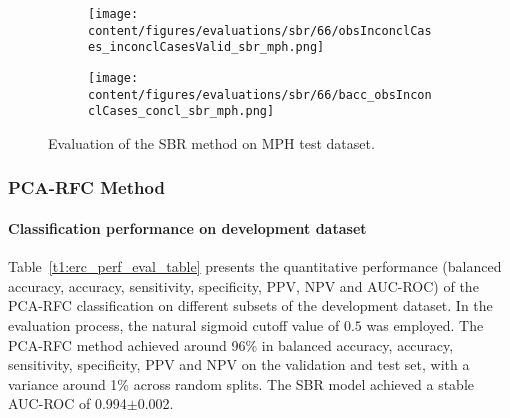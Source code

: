 \begin{figure}[ht]
  \begin{subfigure}{0.49\textwidth}
    \centering
    \texttt{[image: content/figures/evaluations/sbr/66/obsInconclCases\_inconclCasesValid\_sbr\_mph.png]}
    \label{fig:obsInconclCases_inconclCasesValid_sbr_mph}
  \end{subfigure}
  \hfill
  \begin{subfigure}{0.49\textwidth}
    \centering
    \texttt{[image: content/figures/evaluations/sbr/66/bacc\_obsInconclCases\_concl\_sbr\_mph.png]}
    \label{fig:bacc_obsInconclCases_concl_sbr_mph}
  \end{subfigure}
  \caption{Evaluation of the SBR method on MPH test dataset.}
  \label{fig:perf_results_sbr_mph}
\end{figure}




\subsubsection{PCA-RFC Method}
\label{subsubsec:eval_rfc}


\paragraph{Classification performance on development dataset}

Table~\ref{t1:erc_perf_eval_table} presents the quantitative performance 
(balanced accuracy, accuracy, sensitivity, specificity, PPV, NPV and AUC-ROC) of the PCA-RFC classification on 
different subsets of the development dataset.
In the evaluation process, the natural sigmoid cutoff value of $0.5$ was employed.
The PCA-RFC method achieved around 96\% in balanced accuracy, accuracy, sensitivity, specificity, PPV and NPV 
on the validation and test set, with a variance around 1\% across random splits.
The SBR model achieved a stable AUC-ROC of 0.994$\pm$0.002.


